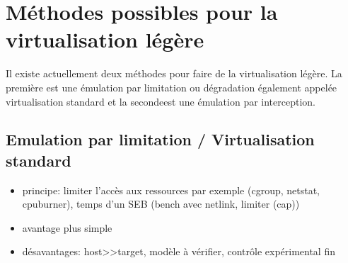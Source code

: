


\section{Méthodes possibles pour la virtualisation légère}
\label{section:emulation}

Il existe actuellement deux méthodes pour faire de la virtualisation légère. La première est une émulation par limitation ou dégradation également appelée virtualisation standard et la secondeest une émulation par interception.

\subsection{Emulation par limitation / Virtualisation standard}
\begin{itemize}
\item principe: limiter l'accès aux ressources par exemple (cgroup, netstat, cpuburner), temps d'un SEB (bench avec netlink, limiter (cap))
\item avantage plus simple
\item désavantages: host>>target, modèle à vérifier, contrôle expérimental fin
\end{itemize}

